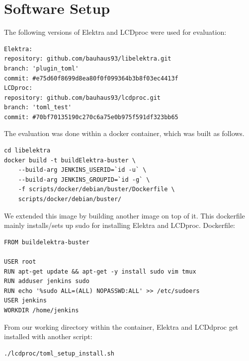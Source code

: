 \documentclass[12pt]{report}
\begin{document}
\section{Software Setup}

The following versions of Elektra and LCDproc were used for evaluation:
\begin{tcolorbox}
\begin{verbatim}
Elektra:
repository: github.com/bauhaus93/libelektra.git
branch: 'plugin_toml'
commit: #e75d60f8699d8ea80f0f099364b3b8f03ec4413f
LCDproc:
repository: github.com/bauhaus93/lcdproc.git
branch: 'toml_test'
commit: #70bf70135190c270c6a75e0b975f591df323bb65
\end{verbatim}
\end{tcolorbox}


The evaluation was done within a docker container, which was built as follows.
\begin{tcolorbox}
\begin{verbatim}
cd libelektra
docker build -t buildElektra-buster \
    --build-arg JENKINS_USERID=`id -u` \
    --build-arg JENKINS_GROUPID=`id -g` \
    -f scripts/docker/debian/buster/Dockerfile \
    scripts/docker/debian/buster/
\end{verbatim}
\end{tcolorbox}

We extended this image by building another image on top of it. This dockerfile mainly installs/sets up sudo for installing Elektra and LCDproc.
Dockerfile:
\begin{tcolorbox}
\small
\begin{verbatim}
FROM buildelektra-buster

USER root
RUN apt-get update && apt-get -y install sudo vim tmux
RUN adduser jenkins sudo
RUN echo '%sudo ALL=(ALL) NOPASSWD:ALL' >> /etc/sudoers
USER jenkins
WORKDIR /home/jenkins
\end{verbatim}
\end{tcolorbox}

From our working directory within the container, Elektra and LCDdproc get installed with another script:
\begin{tcolorbox}
\small
\begin{verbatim}
./lcdproc/toml_setup_install.sh
\end{verbatim}
\end{tcolorbox}
\end{document}
